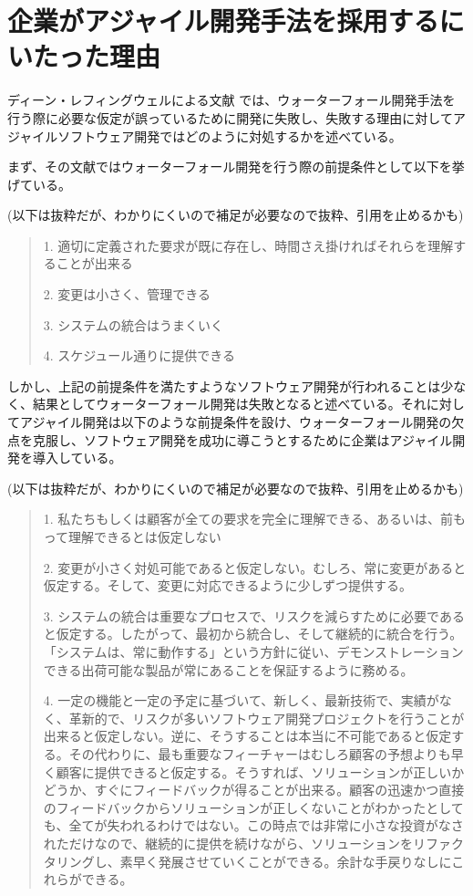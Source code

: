 \section{企業がアジャイル開発手法を採用するにいたった理由}

ディーン・レフィングウェルによる文献 \cite{leffingwell2010アジャイル開発の本質とスケールアップ}では、ウォーターフォール開発手法を行う際に必要な仮定が誤っているために開発に失敗し、失敗する理由に対してアジャイルソフトウェア開発ではどのように対処するかを述べている。

まず、その文献ではウォーターフォール開発を行う際の前提条件として以下を挙げている。

(以下は抜粋だが、わかりにくいので補足が必要なので抜粋、引用を止めるかも)

\begin{quote}
  1. 適切に定義された要求が既に存在し、時間さえ掛ければそれらを理解することが出来る

  2. 変更は小さく、管理できる

  3. システムの統合はうまくいく

  4. スケジュール通りに提供できる
\end{quote}

しかし、上記の前提条件を満たすようなソフトウェア開発が行われることは少なく、結果としてウォーターフォール開発は失敗となると述べている。それに対してアジャイル開発は以下のような前提条件を設け、ウォーターフォール開発の欠点を克服し、ソフトウェア開発を成功に導こうとするために企業はアジャイル開発を導入している。

(以下は抜粋だが、わかりにくいので補足が必要なので抜粋、引用を止めるかも)

\begin{quote}
  1. 私たちもしくは顧客が全ての要求を完全に理解できる、あるいは、前もって理解できるとは仮定しない

  2. 変更が小さく対処可能であると仮定しない。むしろ、常に変更があると仮定する。そして、変更に対応できるように少しずつ提供する。

  3. システムの統合は重要なプロセスで、リスクを減らすために必要であると仮定する。したがって、最初から統合し、そして継続的に統合を行う。「システムは、常に動作する」という方針に従い、デモンストレーションできる出荷可能な製品が常にあることを保証するように務める。

  4. 一定の機能と一定の予定に基づいて、新しく、最新技術で、実績がなく、革新的で、リスクが多いソフトウェア開発プロジェクトを行うことが出来ると仮定しない。逆に、そうすることは本当に不可能であると仮定する。その代わりに、最も重要なフィーチャーはむしろ顧客の予想よりも早く顧客に提供できると仮定する。そうすれば、ソリューションが正しいかどうか、すぐにフィードバックが得ることが出来る。顧客の迅速かつ直接のフィードバックからソリューションが正しくないことがわかったとしても、全てが失われるわけではない。この時点では非常に小さな投資がなされただけなので、継続的に提供を続けながら、ソリューションをリファクタリングし、素早く発展させていくことができる。余計な手戻りなしにこれらができる。

\end{quote}
